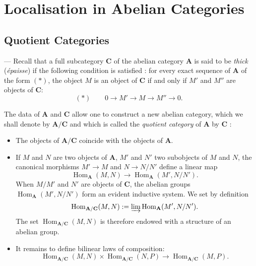 %
%

\chapter{Localisation in Abelian Categories}

\section{Quotient Categories}

--- Recall that a full subcategory $\mathbf C$ of the abelian category
$\mathbf A$ is said to be \emph{thick} (\emph{épaisse}) if the following
condition is satisfied \cite{grothendieck-1}: for every exact sequence of
$\mathbf A$ of the form $(*)$, the object $M$ is an object of
$\mathbf C$ if and only if $M'$ and $M''$ are objects of $\mathbf C$:
\[
(*)\qquad 0 \to M' \to M \to M'' \to 0.
\]

The data of $\mathbf A$ and $\mathbf C$ allow one to construct a new
abelian category, which we shall denote by $\mathbf A/\mathbf C$ and
which is called the \emph{quotient category} of $\mathbf A$ by
$\mathbf C$ \cite{grothendieck-1}:

\begin{itemize}
\item The objects of $\mathbf A/\mathbf C$ coincide with the objects of
      $\mathbf A$.

\item If $M$ and $N$ are two objects of $\mathbf A$, $M'$ and $N'$ two
      subobjects of $M$ and $N$, the canonical morphisms $M'\to M$ and
      $N\to N/N'$ define a linear map
      \[
        \operatorname{Hom}_{\mathbf A}(M,N)\longrightarrow
        \operatorname{Hom}_{\mathbf A}(M',N/N').
      \]
      When $M/M'$ and $N'$ are objects of $\mathbf C$, the abelian
      groups $\operatorname{Hom}_{\mathbf A}(M',N/N')$ form an evident
      inductive system. We set by definition
      \[
        \operatorname{Hom}_{\mathbf A/\mathbf C}(M,N) :=
        \varinjlim \operatorname{Hom}_{\mathbf A}(M',N/N').
      \]
      The set $\operatorname{Hom}_{\mathbf A/\mathbf C}(M,N)$ is therefore
      endowed with a structure of an abelian group.

\item It remains to define bilinear laws of composition:
      \[
        \operatorname{Hom}_{\mathbf A/\mathbf C}(M,N)\times
        \operatorname{Hom}_{\mathbf A/\mathbf C}(N,P)\longrightarrow
        \operatorname{Hom}_{\mathbf A/\mathbf C}(M,P).
      \]
\end{itemize}

